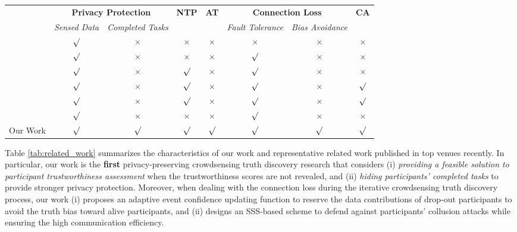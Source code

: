 \begin{table*}[t]
	\footnotesize
	\centering
	\caption{Comparison of our work and representative related work. (NTP: No Third Party, AT: Assess Trustworthiness,  CA: Collusion Attacks)}
	\label{tab:related_work}
	\begin{tabular}{@{}lccccccc@{}}
		\toprule
		\textbf{} &
		\multicolumn{2}{c}{\textbf{Privacy Protection}}
		&
		\textbf{NTP} &
		\textbf{AT} &
		\multicolumn{2}{c}{\textbf{Connection Loss}} & \textbf{CA} \\
		&
		\textit{Sensed Data} &
		\textit{Completed Tasks}
		&
		&
		& \textit{Fault Tolerance} & \textit{Bias Avoidance}
		& \\
		\midrule
		\citet{Miao2017ALP} & $\surd$  & $\times$ & $\times$ & $\times$  & $\times$ & $\times$ & $\times$ \\
		\citet{Zheng2018LearningTT} & $\surd$  & $\times$ & $\times$ & $\times$  & $\surd$ & $\times$ & $\times$ \\
		\citet{Miao2019PrivacyPreservingTD}  & $\surd$  & $\times$ & $\surd$ & $\times$  & $\surd$ & $\times$  & $\times$ \\
		\citet{Xu2019EfficientAP}  & $\surd$ & $\times$ & $\surd$ & $\times$ & $\surd$ & $\times$ & $\surd$ \\
		\citet{Zheng2020PrivacyAwareAE} & $\surd$ & $\times$ & $\surd$ & $\times$ & $\surd$ & $\times$ & $\surd$ \\
		\citet{Zhang2021ReliableAP}  & $\surd$ & $\times$ & $\times$ & $\times$ & $
		\surd$ & $\times$ & $\times$\\
		Our Work & $\surd$ & $\surd$ & $\surd$ & $\surd$ & $\surd$ & $\surd$ & $\surd$ \\ \bottomrule
	\end{tabular}
\end{table*}


Table \ref{tab:related_work} summarizes the characteristics of our work and representative related work published in top venues recently. In particular, our work is the \textbf{first} privacy-preserving crowdsensing truth discovery research that considers (i) \textit{providing a feasible solution to participant trustworthiness assessment} when the trustworthiness scores are not revealed, and (ii) \textit{hiding participants' completed tasks} to provide stronger privacy protection. Moreover, when dealing with the connection loss during the iterative crowdsensing truth discovery process, our work (i) proposes an adaptive event confidence updating function to reserve the data contributions of drop-out participants to avoid the truth bias toward alive participants, and (ii) designs an SSS-based scheme to defend against participants' collusion attacks while ensuring the high communication efficiency.

